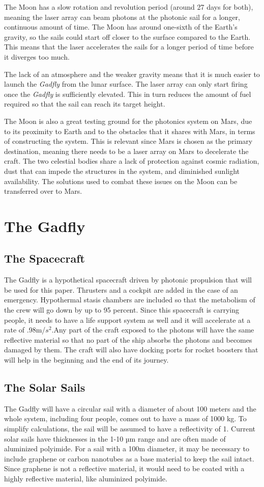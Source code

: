 \documentclass{aa}
\begin{document}
    The Moon has a slow rotation and revolution period (around 27 days for both), meaning the laser array can beam photons at the photonic sail for a longer, continuous amount of time. The Moon has around one-sixth of the Earth’s gravity, so the sails could start off closer to the surface compared to the Earth. This means that the laser accelerates the sails for a longer period of time before it diverges too much.
    
    The lack of an atmosphere and the weaker gravity means that it is much easier to launch the \textit{Gadfly} from the lunar surface. The laser array can only start firing once the \textit{Gadfly} is sufficiently elevated. This in turn reduces the amount of fuel required so that the sail can reach its target height.
   
    The Moon is also a great testing ground for the photonics system on Mars, due to its proximity to Earth and to the obstacles that it shares with Mars, in terms of constructing the system. This is relevant since Mars is chosen as the primary destination, meaning there needs to be a laser array on Mars to decelerate the craft. The two celestial bodies share a lack of protection against cosmic radiation, dust that can impede the structures in the system, and diminished sunlight availability. The solutions used to combat these issues on the Moon can be transferred over to Mars.

\section{The Gadfly}
\subsection{The Spacecraft}
	The Gadfly is a hypothetical spacecraft driven by photonic propulsion that will be used for this paper. Thrusters and a cockpit are added in the case of an emergency. Hypothermal stasis chambers are included so that the metabolism of the crew will go down by up to 95 percent. Since this spacecraft is carrying people, it needs to have a life support system as well and it will accelerate at a rate of .98m/$s^2$.Any part of the craft exposed to the photons will have the same reflective material so that no part of the ship absorbs the photons and becomes damaged by them. The craft will also have docking ports for rocket boosters that will help in the beginning and the end of its journey.
\subsection{The Solar Sails}
	The Gadfly will have a circular sail with a diameter of about 100 meters and the whole system, including four people, comes out to have a mass of 1000 kg. To simplify calculations, the sail will be assumed to have a reflectivity of 1. Current solar sails have thicknesses in the 1-10 µm range and are often made of aluminized polyimide. For a sail with a 100m diameter, it may be necessary to include graphene or carbon nanotubes as a base material to keep the sail intact. Since graphene is not a reflective material, it would need to be coated with a highly reflective material, like aluminized polyimide.
	
\end{document}
